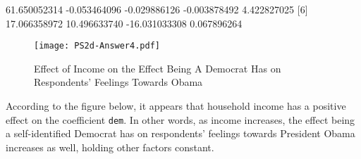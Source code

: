 \documentclass[12pt]{article}
\begin{document}
\begin{enumerate}
\begin{Schunk}
\begin{Soutput}
[1]  61.650052314  -0.053464096  -0.029886126  -0.003878492   4.422827025
[6]  17.066358972  10.496633740 -16.031033308   0.067896264
\end{Soutput}
\end{Schunk}

\begin{figure}[htbp] 
  \caption{Effect of Income on the Effect Being A Democrat Has on Respondents' Feelings Towards Obama}
  \label{F:spread}
  \begin{center}
    \texttt{[image: PS2d-Answer4.pdf]}
  \end{center}
\end{figure}

According to the figure below, it appears that household income has a positive effect on the coefficient \texttt{dem}. In other words, as income increases, the effect being a self-identified Democrat has on respondents' feelings towards President Obama increases as well, holding other factors constant.

\newpage


\end{enumerate}
\end{document}
